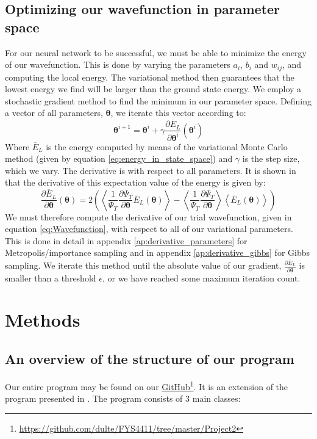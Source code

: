\documentclass[a4paper, 10pt]{article}
\begin{document}
	\subsection{Optimizing our wavefunction in parameter space}
	For our neural network to be successful, we must be able to minimize the energy of our wavefunction. This is done by varying the parameters $a_i$, $b_i$ and $w_{ij}$, and computing the local energy. The variational method then guarantees that the lowest energy we find will be larger than the ground state energy. We employ a stochastic gradient method to find the minimum in our parameter space. Defining a vector of all parameters, $\boldsymbol{\theta}$, we iterate this vector according to:
	\begin{equation}\label{eq:Minimization_theory}
	\boldsymbol{\theta}^{i+1}=\boldsymbol{\theta}^i + \gamma \frac{\partial \overline{E}_L}{\partial \boldsymbol{\theta}^i}(\boldsymbol{\theta}^i)
	\end{equation}
	Where $\overline{E}_L$ is the energy computed by means of the variational Monte Carlo method (given by equation \ref{eq:energy_in_state_space}) and $\gamma$ is the step size, which we vary. The derivative is with respect to all parameters. It is shown in \cite{Heinsen2018} that the derivative of this expectation value of the energy is given by:
	\begin{equation}
	\frac{\partial \overline{E}_L}{\partial \boldsymbol{\theta}}(\boldsymbol{\theta})=2\left(\left\langle \frac{1}{\Psi_T}\frac{\partial \Psi_T}{\partial \boldsymbol{\theta}}\overline{E}_L(\boldsymbol{\theta})\right\rangle-\left\langle \frac{1}{\Psi_T}\frac{\partial \Psi_T}{\partial \boldsymbol{\theta}}\right\rangle\left\langle \overline{E}_L(\boldsymbol{\theta})\right\rangle\right)
	\end{equation}
	We must therefore compute the derivative of our trial wavefunction, given in equation \ref{eq:Wavefunction}, with respect to all of our variational parameters.
	This is done in detail in appendix \ref{ap:derivative_parameters} for Metropolis/importance sampling and in appendix \ref{ap:derivative_gibbs} for Gibbs sampling. We iterate this method until the absolute value of our gradient, $\frac{\partial \overline{E}_L}{\partial \boldsymbol{\theta}}$  is smaller than a threshold $\epsilon$, or we have reached some maximum iteration count.
	\section{Methods}\label{Method_section}
	\subsection{An overview of the structure of our program}
	Our entire program may be found on our \href{https://github.com/dulte/FYS4411/tree/master/Project2}{GitHub}\footnote{\url{https://github.com/dulte/FYS4411/tree/master/Project2}}. It is an extension of the program presented in \cite{Heinsen2018}. The program consists of $3$ main classes:
\end{document}

